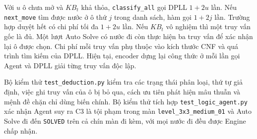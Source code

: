 Với $u$ ô chưa mở và $KB_t$ khả thỏa, \texttt{classify\_all} gọi DPLL
$1+2u$ lần. Nếu \texttt{next\_move} tìm được nước ở ô thứ $j$ trong danh
sách, hàm gọi $1+2j$ lần. Trường hợp duyệt hết có chi phí tối đa $1+2u$
lần. Nếu $KB_t$ vô nghiệm thì một truy vấn gốc là đủ. Một lượt Auto Solve
có nước đi còn thực hiện ba truy vấn để xác nhận lại ô được chọn. Chi phí
mỗi truy vấn phụ thuộc vào kích thước CNF và quá trình tìm kiếm của DPLL.
Hiện tại, encoder dựng lại công thức ở mỗi lần gọi Agent và DPLL giải từng
truy vấn độc lập.

Bộ kiểm thử \texttt{test\_deduction.py} kiểm tra các trạng thái phân loại,
thứ tự giả định, việc ghi truy vấn của ô bị bỏ qua, cách ưu tiên phát hiện
mâu thuẫn và mệnh đề chặn chỉ dùng biến chính. Bộ kiểm thử tích hợp
\texttt{test\_logic\_agent.py} xác nhận Agent suy ra C3 là tội phạm trong
màn \texttt{level\_3x3\_medium\_01} và Auto Solve đi đến \texttt{SOLVED}
trên cả chín màn đi kèm, với mọi nước đi đều được Engine chấp nhận.
